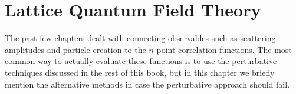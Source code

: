 \chapter{Lattice Quantum Field Theory}

The past few chapters dealt with connecting observables such as scattering amplitudes and particle creation to the $n$-point correlation functions. The most common way to actually evaluate these functions is to use the perturbative techniques discussed in the rest of this book, but in this chapter we briefly mention the alternative methods in case the perturbative approach should fail.


